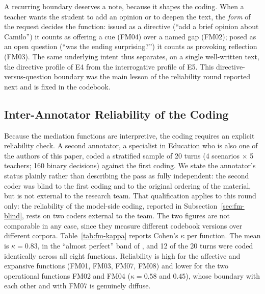 \documentclass{sbc2023}%
\begin{document}
A recurring boundary deserves a note, because it shapes the coding. When a teacher wants the student to add an opinion or to deepen the text, the \textit{form} of the request decides the function: issued as a directive (``add a brief opinion about Camilo'') it counts as offering a cue (FM04) over a named gap (FM02); posed as an open question (``was the ending surprising?'') it counts as provoking reflection (FM03). The same underlying intent thus separates, on a single well-written text, the directive profile of E4 from the interrogative profile of E5. This directive-versus-question boundary was the main lesson of the reliability round reported next and is fixed in the codebook.

\subsection{Inter-Annotator Reliability of the Coding}
\label{sec:fm-kappa}

Because the mediation functions are interpretive, the coding requires an explicit reliability check. A second annotator, a specialist in Education who is also one of the authors of this paper, coded a stratified sample of 20 turns (4 scenarios $\times$ 5 teachers; 160 binary decisions) against the first coding. We state the annotator's status plainly rather than describing the pass as fully independent: the second coder was blind to the first coding and to the original ordering of the material, but is not external to the research team. That qualification applies to this round only: the reliability of the model-side coding, reported in Subsection~\ref{sec:fm-blind}, rests on two coders external to the team. The two figures are not comparable in any case, since they measure different codebook versions over different corpora. Table~\ref{tab:fm-kappa} reports Cohen's $\kappa$ per function. The mean is $\kappa = 0.83$, in the ``almost perfect'' band of \citet{landis1977measurement}, and 12 of the 20 turns were coded identically across all eight functions. Reliability is high for the affective and expansive functions (FM01, FM03, FM07, FM08) and lower for the two operational functions FM02 and FM04 ($\kappa = 0.58$ and $0.45$), whose boundary with each other and with FM07 is genuinely diffuse.
\end{document}
